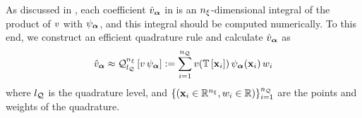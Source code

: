 As discussed in , each coefficient $\hat{v}_{\bm{\alpha}}$ in  is an ${n_\xi}$-dimensional integral of the product of $v$ with $\psi_{\bm{\alpha}}$, and this integral should be computed numerically.
To this end, we construct an efficient quadrature rule and calculate $\hat{v}_{\bm{\alpha}}$ as
\[
  \coefficient{\w}_{\multiindex} \approx \quadrature{\nvars}{\nqlevel}{\w \, \polynomial_{\multiindex}} := \sum_{i = 1}^\nqorder \w(\transformation{\point_i}) \, \polynomial_{\multiindex}(\point_i) \, \weight_i
\]
where ${l_\mathcal{Q}}$ is the quadrature level, and $\{ (\mathbf{x}_i \in \mathbb{R}^{n_\xi}, w_i \in \mathbb{R}) \}_{i = 1}^{n_\mathcal{Q}}$ are the points and weights of the quadrature.

